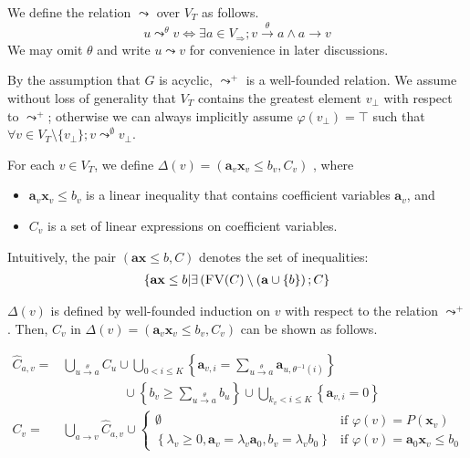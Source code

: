 \documentclass[a4paper,12pt]{article}
\newcommand{\edge}[2]{#1\rightarrow#2}
\newcommand{\edgel}[3]{#1\xrightarrow{#2}#3}
\begin{document}
We define the relation $\leadsto$ over $V_T$ as follows.
\[ u \mathop{\leadsto}^\theta v \Longleftrightarrow
\exists a \in V_\Rightarrow; \edgel{v}{\theta}{a} \wedge \edge{a}{v} \]
We may omit $\theta$ and write $u \leadsto v$ for convenience in later
discussions.

By the assumption that $G$ is acyclic, $\leadsto^+$ is a well-founded
relation. We assume without loss of generality that $V_T$ contains the
greatest element $v_\bot$ with respect to $\leadsto^+$; otherwise we
can always implicitly assume $\varphi(v_\bot) = \top$ such that
$\forall v \in V_T \setminus \{v_\bot\}; v \mathop{\leadsto}^\emptyset v_\bot$.

For each $v \in V_T$, we define
$\Delta(v) = (\mathbf{a}_v \mathbf{x}_v \leq b_v, C_v)$
, where
\begin{itemize}
\item $\mathbf{a}_v \mathbf{x}_v \leq b_v$ is a linear inequality that
  contains coefficient variables $\mathbf{a}_v$, and
\item $C_v$ is a set of linear expressions on coefficient variables.
\end{itemize}
Intuitively, the pair $(\mathbf{a} \mathbf{x} \leq b, C)$ denotes the
set of inequalities:
\begin{align*}
\left\lbrace
 \mathbf{a} \mathbf{x} \leq b \middle|
 \exists \left( \textsc{FV}(C)
  \setminus (\mathbf{a} \cup \left\lbrace b \right\rbrace
 \right); C
\right\rbrace
\end{align*}

$\Delta(v)$ is defined by well-founded induction on $v$ with respect
to the relation $\leadsto^+$. Then, $C_v$ in
$\Delta(v) = \left( \mathbf{a}_v \mathbf{x}_v \leq b_v, C_v \right)$
can be shown as follows.

\begin{align*}
\hat C_{a,v} = &
 \bigcup_{\edgel{u}{\theta}{a}} C_u \cup
 \bigcup_{0 < i \leq K}
 \left\lbrace
  \mathbf{a}_{v,i} = \sum_{\edgel{u}{\theta}{a}} \mathbf{a}_{u, \theta^{-1} (i)}
 \right\rbrace \\
 & \hspace{2cm} \cup
 \left\lbrace
  b_v \geq \sum_{\edgel{u}{\theta}{a}} b_u
 \right\rbrace \cup
 \bigcup_{k_v < i \leq K}
 \left\lbrace \mathbf{a}_{v,i} = 0 \right\rbrace
\\
C_v = & \bigcup_{\edge{a}{v}} \hat C_{a,v} \cup
\begin{cases}
\emptyset
& \mbox{if } \varphi(v) = P(\mathbf{x}_v) \\
\left\lbrace
 \lambda_v \geq 0, \mathbf{a}_v = \lambda_v \mathbf{a}_0,
 b_v = \lambda_v b_0
\right\rbrace
& \mbox{if } \varphi(v) = \mathbf{a}_0 \mathbf{x}_v \leq b_0
\end{cases}
\end{align*}
\end{document}
